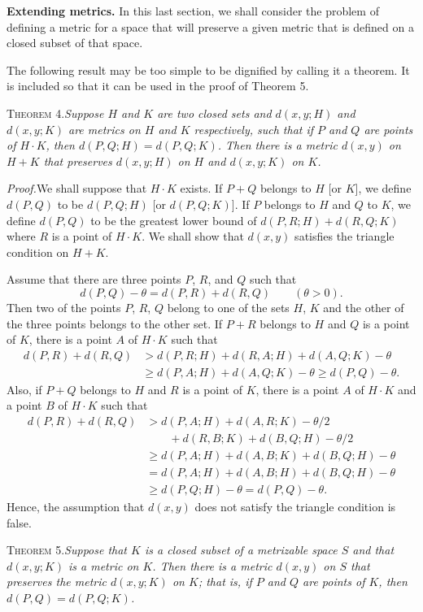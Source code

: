\documentclass[11pt,a4paper,leqno,twoside]{article}
\newcommand{\heading}[1]{\par\medskip\noindent\textbf{#1}\enspace}
\newcommand{\thm}[2]{\par\medskip\noindent\textsc{Theorem #1.}\enspace\textit{#2}\par}
\newcommand{\proof}{\par\noindent\textit{Proof.}\enspace}
\begin{document}
\heading{Extending metrics.} In this last section, we shall consider the problem of defining a metric for a space that will preserve a given metric that is defined on a closed subset of that space.

The following result may be too simple to be dignified by calling it a theorem. It is included so that it can be used in the proof of Theorem 5.

\thm{4}{Suppose $H$ and $K$ are two closed sets and $d(x,y;H)$ and $d(x,y;K)$ are metrics on $H$ and $K$ respectively, such that if $P$ and $Q$ are points of $H\cdot K$, then $d(P,Q;H)=d(P,Q;K)$. Then there is a metric $d(x,y)$ on $H+K$ that preserves $d(x,y;H)$ on $H$ and $d(x,y;K)$ on $K$.}

\proof We shall suppose that $H\cdot K$ exists. If $P+Q$ belongs to $H$ [or $K$], we define $d(P,Q)$ to be $d(P,Q;H)$ [or $d(P,Q;K)$]. If $P$ belongs to $H$ and $Q$ to $K$, we define $d(P,Q)$ to be the greatest lower bound of $d(P,R;H)+d(R,Q;K)$ where $R$ is a point of $H\cdot K$. We shall show that $d(x,y)$ satisfies the triangle condition on $H+K$.

Assume that there are three points $P$, $R$, and $Q$ such that
\[
d(P,Q)-\theta=d(P,R)+d(R,Q)\qquad(\theta>0).
\]
Then two of the points $P$, $R$, $Q$ belong to one of the sets $H$, $K$ and the other of the three points belongs to the other set. If $P+R$ belongs to $H$ and $Q$ is a point of $K$, there is a point $A$ of $H\cdot K$ such that
\[
\begin{aligned}
d(P,R)+d(R,Q)&>d(P,R;H)+d(R,A;H)+d(A,Q;K)-\theta\\
&\geq d(P,A;H)+d(A,Q;K)-\theta\geq d(P,Q)-\theta.
\end{aligned}
\]
Also, if $P+Q$ belongs to $H$ and $R$ is a point of $K$, there is a point $A$ of $H\cdot K$ and a point $B$ of $H\cdot K$ such that
\[
\begin{aligned}
d(P,R)+d(R,Q)&>d(P,A;H)+d(A,R;K)-\theta/2\\
&\qquad+d(R,B;K)+d(B,Q;H)-\theta/2\\
&\geq d(P,A;H)+d(A,B;K)+d(B,Q;H)-\theta\\
&=d(P,A;H)+d(A,B;H)+d(B,Q;H)-\theta\\
&\geq d(P,Q;H)-\theta=d(P,Q)-\theta.
\end{aligned}
\]
\newpage
\noindent Hence, the assumption that $d(x,y)$ does not satisfy the triangle condition is false.

\thm{5}{Suppose that $K$ is a closed subset of a metrizable space $S$ and that $d(x,y;K)$ is a metric on $K$. Then there is a metric $d(x,y)$ on $S$ that preserves the metric $d(x,y;K)$ on $K$; that is, if $P$ and $Q$ are points of $K$, then $d(P,Q)=d(P,Q;K)$.}
\end{document}
